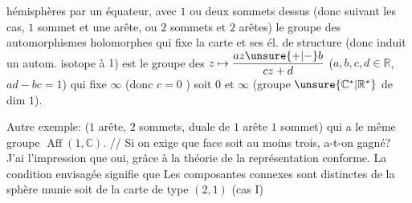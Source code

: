 hémisphères par un équateur, avec $1$ ou
deux sommets dessus (donc suivant les
cas, $1$ sommet et une arête, ou $2$ sommets
et $2$ arêtes) le groupe des automorphismes
holomorphes qui fixe la carte et ses
él. de structure (donc induit un
autom. isotope à $1$) est le groupe des
$z\mapsto\dfrac{az\unsure{+|-}b}{cz+d}$ ($a,b,c,d\in\mathbb{R}$, $ad-bc=1$) qui fixe
$\infty$ (donc $c=0$  )
soit $0$ et $\infty$ (groupe $\unsure{\mathbb{C}^*|\mathbb{R}^*}$ de dim $1$).

Autre exemple:
($1$ arête, $2$ sommets,
duale de $1$ arête $1$ sommet) qui a
le même groupe $\operatorname{Aff}(1,\mathbb{C})$. // Si on exige
que  
face  soit au
moins trois, a-t-on gagné? J'ai
l'impression que oui, grâce à la
théorie de la représentation conforme.
La condition envisagée signifie que
Les composantes connexes sont 
distinctes de la sphère munie
soit de la carte de type $(2,1)$ (cas I)
